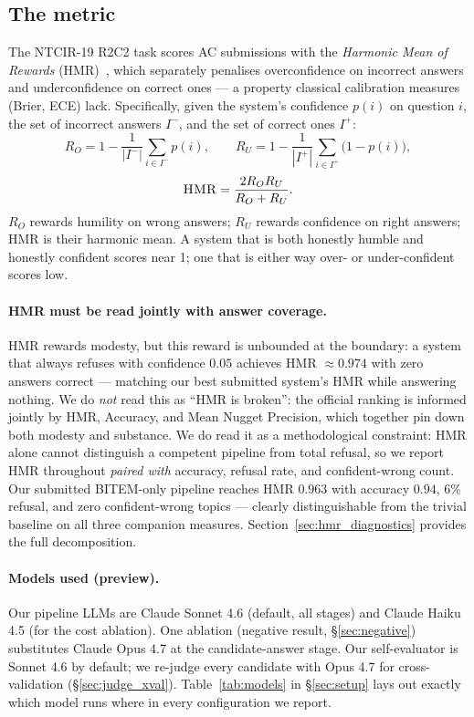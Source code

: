 \documentclass[11pt,a4paper]{article}
\newcommand{\HMR}{\textsc{HMR}}
\begin{document}
\subsection{The metric}

The NTCIR-19 R2C2 task \cite{r2c2-2026} scores AC submissions with the
\emph{Harmonic Mean of Rewards} (HMR)~\cite{sakai-hmr}, which separately
penalises overconfidence on incorrect answers and underconfidence on
correct ones — a property classical calibration measures (Brier, ECE)
lack. Specifically, given the system's confidence $p(i)$ on question
$i$, the set of incorrect answers $I^-$, and the set of correct ones
$I^+$:
\[
  R_O = 1 - \frac{1}{|I^-|}\sum_{i \in I^-} p(i),
  \qquad
  R_U = 1 - \frac{1}{|I^+|}\sum_{i \in I^+}\bigl(1 - p(i)\bigr),
\]
\[
  \HMR = \frac{2 R_O R_U}{R_O + R_U}.
\]
$R_O$ rewards humility on wrong answers; $R_U$ rewards confidence on
right answers; \HMR{} is their harmonic mean. A system that is both
honestly humble and honestly confident scores near 1; one that is
either way over- or under-confident scores low.

\paragraph{HMR must be read jointly with answer coverage.}\label{sec:hmr_fragility}
HMR rewards modesty, but this reward is unbounded at the boundary: a
system that always refuses with confidence $0.05$ achieves
\HMR{} $\approx 0.974$ with zero answers correct — matching our best
submitted system's HMR while answering nothing. We do \emph{not} read
this as ``HMR is broken'': the official ranking is informed jointly by
HMR, Accuracy, and Mean Nugget Precision, which together pin down both
modesty and substance. We do read it as a methodological constraint:
HMR alone cannot distinguish a competent pipeline from total refusal,
so we report HMR throughout \emph{paired with} accuracy, refusal rate,
and confident-wrong count. Our submitted BITEM-only pipeline reaches
HMR $0.963$ with accuracy $0.94$, 6\% refusal, and zero confident-wrong
topics — clearly distinguishable from the trivial baseline on all three
companion measures. Section~\ref{sec:hmr_diagnostics} provides the full
decomposition.

\paragraph{Models used (preview).}
Our pipeline LLMs are Claude Sonnet 4.6 (default, all stages) and
Claude Haiku 4.5 (for the cost ablation). One ablation (negative
result, \S\ref{sec:negative}) substitutes Claude Opus 4.7 at the
candidate-answer stage. Our self-evaluator is Sonnet 4.6 by default;
we re-judge every candidate with Opus 4.7 for cross-validation
(\S\ref{sec:judge_xval}). Table~\ref{tab:models} in
\S\ref{sec:setup} lays out exactly which model runs where in every
configuration we report.
\end{document}
